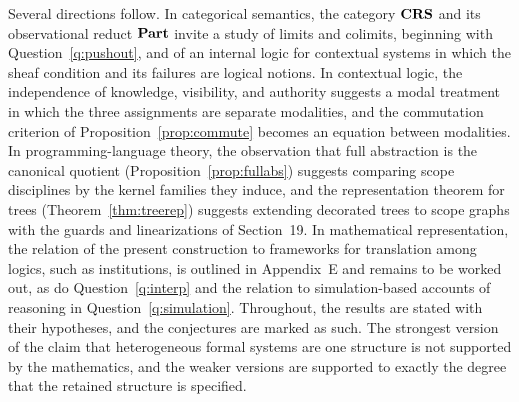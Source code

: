 Several directions follow. In categorical semantics, the category $\mathbf{CRS}$ and its observational reduct $\mathbf{Part}$ invite a study of limits and colimits, beginning with Question~\ref{q:pushout}, and of an internal logic for contextual systems in which the sheaf condition and its failures are logical notions. In contextual logic, the independence of knowledge, visibility, and authority suggests a modal treatment in which the three assignments are separate modalities, and the commutation criterion of Proposition~\ref{prop:commute} becomes an equation between modalities. In programming-language theory, the observation that full abstraction is the canonical quotient (Proposition~\ref{prop:fullabs}) suggests comparing scope disciplines by the kernel families they induce, and the representation theorem for trees (Theorem~\ref{thm:treerep}) suggests extending decorated trees to scope graphs with the guards and linearizations of Section~19. In mathematical representation, the relation of the present construction to frameworks for translation among logics, such as institutions, is outlined in Appendix~E and remains to be worked out, as do Question~\ref{q:interp} and the relation to simulation-based accounts of reasoning in Question~\ref{q:simulation}. Throughout, the results are stated with their hypotheses, and the conjectures are marked as such. The strongest version of the claim that heterogeneous formal systems are one structure is not supported by the mathematics, and the weaker versions are supported to exactly the degree that the retained structure is specified.
